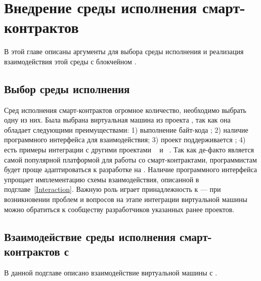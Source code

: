 \section{Внедрение среды исполнения смарт-кон\-трак\-тов}
В этой главе описаны аргументы для выбора среды исполнения и реализация взаимодействия этой среды с блокчейном .

\subsection{Выбор среды исполнения}
Сред исполнения смарт-контрактов огромное количество, необходимо выбрать одну из них.
Была выбрана виртуальная машина из проекта , так как она обладает следующими преимуществами: 1) выполнение байт-кода ; 2) наличие программного интерфейса для взаимодействия; 3) проект поддерживается ; 4) есть примеры интеграции с другими проектами ~\cite{HLFabricEVM} и ~\cite{HLSeth}.
Так как  де-факто является самой популярной платформой для работы со смарт-контрактами, программистам будет проще адаптироваться к разработке на .
Наличие программного интерфейса упрощает имплементацию схемы взаимодействия, описанной в подглаве~\ref{Interaction}.
Важную роль играет принадлежность к  --- при возникновении проблем и вопросов на этапе интеграции виртуальной машины можно обратиться к сообществу разработчиков указанных ранее проектов.

\subsection{Взаимодействие среды исполнения смарт-кон\-трак\-тов с }
В данной подглаве описано взаимодействие виртуальной машины  с .

